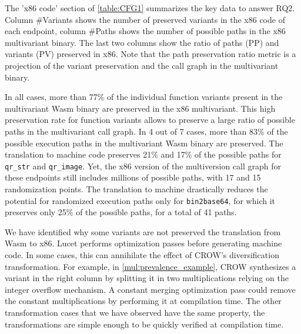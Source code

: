The 'x86 code' section of \autoref{table:CFG1} summarizes the key data to answer RQ2. Column \#Variants shows the number of preserved variants in the x86 code of each endpoint, column \#Paths shows the number of possible paths in the x86 multivariant binary. The last two columns show  the ratio of paths (PP) and variants (PV) preserved in x86. 
Note that the path preservation ratio metric is a projection of the variant preservation and the call graph in the multivariant binary.

 
In all cases, more than 77\% of the individual function variants present in the multivariant Wasm binary are preserved in the x86 multivariant. This high preservation rate for function variants allows to preserve a large ratio of possible paths in the multivariant call graph.
In 4 out of 7 cases, more than 83\% of the possible execution paths in the multivariant Wasm  binary are preserved.
The translation to machine code preserves 21\% and 17\% of the possible paths for \texttt{qr\_str} and \texttt{qr\_image}. Yet, the x86 version of the multiversion call graph for these endpoints still includes millions of possible paths, with 17 and 15 randomization points. The translation to machine drastically reduces the potential for randomized execution paths only for \texttt{bin2base64}, for which it preserves only 25\% of the possible paths, for a total of 41 paths.

We have identified why some variants are not preserved the translation from Wasm to x86. Lucet performs optimization passes before generating machine code. 
In some cases, this can annihilate the effect of CROW's diversification transformation. 
For example, in \autoref{mul:prevalence_example}, CROW synthesizes a variant in the right column by splitting it in two  multiplications relying on the integer overflow mechanism. 
A  constant merging optimization pass could remove the constant multiplications by performing it at compilation time. 
The other transformation cases that we have observed have the same property, the transformations are simple enough to be quickly verified at compilation time.

